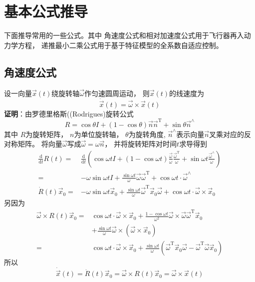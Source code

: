 \section{基本公式推导}
下面推导常用的一些公式。其中
角速度公式和相对加速度公式用于飞行器再入动力学方程，
递推最小二乘公式用于基于特征模型的全系数自适应控制。

\subsection{角速度公式}
设一向量$\vec{x}(t)$绕旋转轴$\vec{\omega}$作匀速圆周运动，
则$\vec{x}(t)$的线速度为
\[\dot{\vec{x}}(t)=\vec{\omega}\times\vec{x}(t)\]
\textbf{证明}：由罗德里格斯((Rodrigues)旋转公式
\[R=\cos\theta I+(1-\cos\theta)\vec{n}\vec{n}^\text{T}+\sin\theta\vec{n}^{\wedge}\]
其中
$R$为旋转矩阵，
$n$为单位旋转轴，
$\theta$为旋转角度,
$\vec{n}^{\wedge}$表示向量$\vec{n}$叉乘对应的反对称矩阵。
将向量$\vec{\omega}$写成$\vec{\omega}=\omega\vec{n}$，
并将旋转矩阵对时间$t$求导得到
\begin{align*}
    \frac{\text{d}}{\text{d}t}R(t)
    =& \frac{\text{d}}{\text{d}t}\left(
        \cos\omega t I
        +(1-\cos\omega t)\frac{\vec{\omega}}{\omega}\frac{\vec{\omega}^\text{T}}{\omega}
        +\sin\omega t\frac{\vec{\omega}^{\wedge}}{\omega}
    \right) \\
    =& -\omega\sin\omega tI
        +\frac{\sin\omega t}{\omega}\vec{\omega}\vec{\omega}^\text{T}
        +\cos\omega t\cdot\vec{\omega}^{\wedge} \\
    \dot{R}(t)\vec{x}_0
    =& -\omega\sin\omega t\vec{x}_0
        +\frac{\sin\omega t}{\omega}\vec{\omega}^\text{T}\vec{x}_0\vec{\omega}
        +\cos\omega t\cdot\vec{\omega}\times\vec{x}_0
\end{align*}
另因为
\begin{align*}
    \vec{\omega}\times R(t)\vec{x}_0
    =& \cos\omega t\cdot\vec{\omega}\times\vec{x}_0
        +\frac{1-\cos\omega t}{\omega^2}\vec{\omega}\times\vec{\omega}\vec{\omega}^\text{T}\vec{x}_0 \\
        &+ \frac{\sin\omega t}{\omega}\vec{\omega}\times(\vec{\omega}\times\vec{x}_0) \\
    =& \cos\omega t\cdot\vec{\omega}\times\vec{x}_0
        +\frac{\sin\omega t}{\omega}(\vec{\omega}^\text{T}\vec{x}_0\vec{\omega}
        -\vec{\omega}^\text{T}\vec{\omega}\vec{x}_0)
\end{align*}
所以
\[\dot{\vec{x}}(t)=\dot{R}(t)\vec{x}_0=\vec{\omega}\times R(t)\vec{x}_0=\vec{\omega}\times\vec{x}(t)\]

